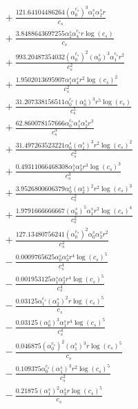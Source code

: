 \documentclass[10pt]{article}
\begin{document}
\begin{align*}
&{}  + \frac{121.64104486264 \left(\alpha_{0}^{c_s}\right)^{3} \alpha_{1}^s \alpha_{2}^s r}{c_{s}} \\
&{}  + \frac{3.8488643697255 \alpha_{2}^s \alpha_{4}^{c_s} r \log{\left(c_{s} \right)}}{c_{s}} \\
&{}  + \frac{993.20487354032 \left(\alpha_{0}^{c_s}\right)^{2} \left(\alpha_{0}^s\right)^{3} \alpha_{1}^{c_s} r^{2}}{c_{s}^{2}} \\
&{}  + \frac{1.9502013695907 \alpha_{1}^s \alpha_{4}^s r^{2} \log{\left(c_{s} \right)}^{2}}{c_{s}^{2}} \\
&{}  + \frac{31.207338156511 \alpha_{0}^{c_s} \left(\alpha_{0}^s\right)^{3} r^{5} \log{\left(c_{s} \right)}}{c_{s}^{5}} \\
&{}  + \frac{62.860078157666 \alpha_{0}^{c_s} \alpha_{1}^s \alpha_{2}^s r^{3}}{c_{s}^{3}} \\
&{}  + \frac{31.497263523221 \alpha_{0}^s \left(\alpha_{1}^s\right)^{3} r^{2} \log{\left(c_{s} \right)}^{2}}{c_{s}^{2}} \\
&{}  + \frac{0.49311066468308 \alpha_{1}^s \alpha_{3}^s r^{3} \log{\left(c_{s} \right)}^{3}}{c_{s}^{3}} \\
&{}  + \frac{3.9526800606379 \alpha_{0}^s \left(\alpha_{2}^s\right)^{2} r^{2} \log{\left(c_{s} \right)}^{3}}{c_{s}^{2}} \\
&{}  + \frac{1.9791666666667 \left(\alpha_{0}^s\right)^{5} \alpha_{1}^s r^{2} \log{\left(c_{s} \right)}^{4}}{c_{s}^{2}} \\
&{}  + \frac{127.13480756241 \left(\alpha_{0}^{c_s}\right)^{2} \alpha_{0}^s \alpha_{3}^s r^{2}}{c_{s}^{2}} \\
&{}  - \frac{0.0009765625 \alpha_{0}^s \alpha_{3}^s r^{4} \log{\left(c_{s} \right)}^{5}}{c_{s}^{4}} \\
&{}  - \frac{0.001953125 \alpha_{1}^s \alpha_{2}^s r^{4} \log{\left(c_{s} \right)}^{5}}{c_{s}^{4}} \\
&{}  - \frac{0.03125 \alpha_{1}^{c_s} \left(\alpha_{2}^s\right)^{2} r \log{\left(c_{s} \right)}^{5}}{c_{s}} \\
&{}  - \frac{0.03125 \left(\alpha_{0}^s\right)^{3} \alpha_{1}^s r^{4} \log{\left(c_{s} \right)}^{5}}{c_{s}^{4}} \\
&{}  - \frac{0.046875 \left(\alpha_{0}^{c_s}\right)^{2} \left(\alpha_{1}^s\right)^{3} r \log{\left(c_{s} \right)}^{5}}{c_{s}} \\
&{}  - \frac{0.109375 \alpha_{0}^{c_s} \left(\alpha_{1}^s\right)^{3} r^{2} \log{\left(c_{s} \right)}^{5}}{c_{s}^{2}} \\
&{}  - \frac{0.21875 \left(\alpha_{1}^s\right)^{2} \alpha_{3}^s r \log{\left(c_{s} \right)}^{5}}{c_{s}} \\

\end{align*}
\end{document}

